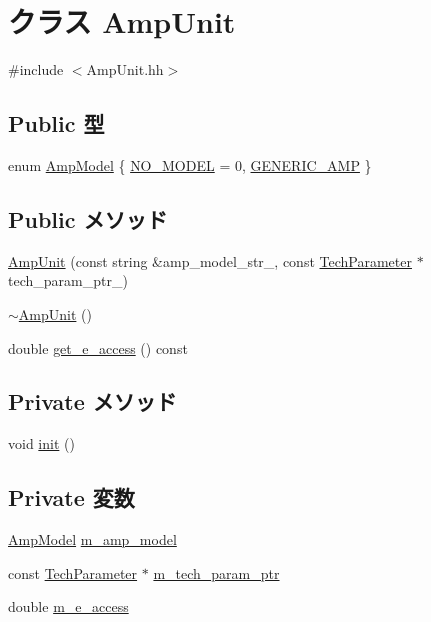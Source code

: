\hypertarget{classAmpUnit}{
\section{クラス AmpUnit}
\label{classAmpUnit}
}


{\ttfamily \#include $<$AmpUnit.hh$>$}\subsection*{Public 型}
\begin{DoxyCompactItemize}
\item 
enum \hyperlink{classAmpUnit_a79e8a1b9fa3eb04d605362bcbdcdc925}{AmpModel} \{ \hyperlink{classAmpUnit_a79e8a1b9fa3eb04d605362bcbdcdc925abab57b6e2c553e4d983f415a1f4ea75b}{NO\_\-MODEL} =  0, 
\hyperlink{classAmpUnit_a79e8a1b9fa3eb04d605362bcbdcdc925acfdc2a079ad70330760f90ae0a0f3040}{GENERIC\_\-AMP}
 \}
\end{DoxyCompactItemize}
\subsection*{Public メソッド}
\begin{DoxyCompactItemize}
\item 
\hyperlink{classAmpUnit_abf9c738c7913c61c54b5231167346f60}{AmpUnit} (const string \&amp\_\-model\_\-str\_\-, const \hyperlink{classTechParameter}{TechParameter} $\ast$tech\_\-param\_\-ptr\_\-)
\item 
\hyperlink{classAmpUnit_a25a24f130a488c02b0d4b6a3a5194bfe}{$\sim$AmpUnit} ()
\item 
double \hyperlink{classAmpUnit_a8c117ce84adebfaff93405744dc25fde}{get\_\-e\_\-access} () const 
\end{DoxyCompactItemize}
\subsection*{Private メソッド}
\begin{DoxyCompactItemize}
\item 
void \hyperlink{classAmpUnit_a02fd73d861ef2e4aabb38c0c9ff82947}{init} ()
\end{DoxyCompactItemize}
\subsection*{Private 変数}
\begin{DoxyCompactItemize}
\item 
\hyperlink{classAmpUnit_a79e8a1b9fa3eb04d605362bcbdcdc925}{AmpModel} \hyperlink{classAmpUnit_a9fdd47f0eac1fb8b364a356153c995ba}{m\_\-amp\_\-model}
\item 
const \hyperlink{classTechParameter}{TechParameter} $\ast$ \hyperlink{classAmpUnit_a11d1644aa2bfe0e16783dface6fadf13}{m\_\-tech\_\-param\_\-ptr}
\item 
double \hyperlink{classAmpUnit_aacef533a11a0322d1c0a20cd7e9b49ea}{m\_\-e\_\-access}
\end{DoxyCompactItemize}


